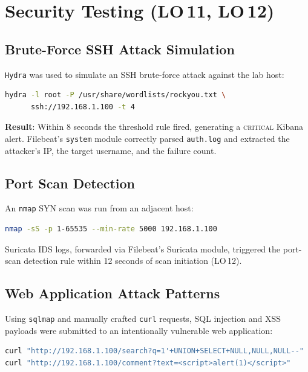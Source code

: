 \documentclass[12pt,a4paper]{report}
\begin{document}
\section{Security Testing (LO\,11, LO\,12)}

\subsection{Brute-Force SSH Attack Simulation}

\texttt{Hydra} was used to simulate an SSH brute-force attack against the lab host:

\begin{lstlisting}[language=bash, caption={SSH brute-force simulation with Hydra}]
hydra -l root -P /usr/share/wordlists/rockyou.txt \
      ssh://192.168.1.100 -t 4
\end{lstlisting}

\textbf{Result}: Within 8 seconds the threshold rule fired, generating a
\textsc{critical} Kibana alert.
Filebeat's \texttt{system} module correctly parsed \texttt{auth.log} and extracted
the attacker's IP, the target username, and the failure count.

\subsection{Port Scan Detection}

An \texttt{nmap} SYN scan was run from an adjacent host:

\begin{lstlisting}[language=bash, caption={Port scan simulation with nmap}]
nmap -sS -p 1-65535 --min-rate 5000 192.168.1.100
\end{lstlisting}

Suricata IDS logs, forwarded via Filebeat's Suricata module, triggered the
port-scan detection rule within 12 seconds of scan initiation (LO\,12).

\subsection{Web Application Attack Patterns}

Using \texttt{sqlmap} and manually crafted \texttt{curl} requests, SQL injection
and XSS payloads were submitted to an intentionally vulnerable web application:

\begin{lstlisting}[language=bash, caption={SQL injection test request}]
curl "http://192.168.1.100/search?q=1'+UNION+SELECT+NULL,NULL,NULL--"
curl "http://192.168.1.100/comment?text=<script>alert(1)</script>"
\end{lstlisting}
\end{document}
